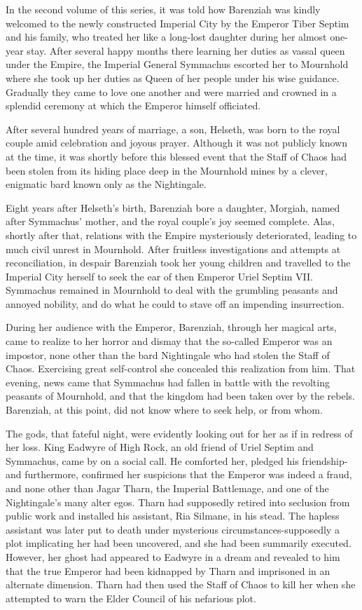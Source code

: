 \clearpage
{}

\dropcap In the second volume of this series, it was told how Barenziah was kindly welcomed to the newly constructed Imperial City by the Emperor Tiber Septim and his family, who treated her like a long-lost daughter during her almost one-year stay. After several happy months there learning her duties as vassal queen under the Empire, the Imperial General Symmachus escorted her to Mournhold where she took up her duties as Queen of her people under his wise guidance. Gradually they came to love one another and were married and crowned in a splendid ceremony at which the Emperor himself officiated.

After several hundred years of marriage, a son, Helseth, was born to the royal couple amid celebration and joyous prayer. Although it was not publicly known at the time, it was shortly before this blessed event that the Staff of Chaos had been stolen from its hiding place deep in the Mournhold mines by a clever, enigmatic bard known only as the Nightingale.

Eight years after Helseth's birth, Barenziah bore a daughter, Morgiah, named after Symmachus' mother, and the royal couple's joy seemed complete. Alas, shortly after that, relations with the Empire mysteriously deteriorated, leading to much civil unrest in Mournhold. After fruitless investigations and attempts at reconciliation, in despair Barenziah took her young children and travelled to the Imperial City herself to seek the ear of then Emperor Uriel Septim VII. Symmachus remained in Mournhold to deal with the grumbling peasants and annoyed nobility, and do what he could to stave off an impending insurrection.

During her audience with the Emperor, Barenziah, through her magical arts, came to realize to her horror and dismay that the so-called Emperor was an impostor, none other than the bard Nightingale who had stolen the Staff of Chaos. Exercising great self-control she concealed this realization from him. That evening, news came that Symmachus had fallen in battle with the revolting peasants of Mournhold, and that the kingdom had been taken over by the rebels. Barenziah, at this point, did not know where to seek help, or from whom.

The gods, that fateful night, were evidently looking out for her as if in redress of her loss. King Eadwyre of High Rock, an old friend of Uriel Septim and Symmachus, came by on a social call. He comforted her, pledged his friendship-and furthermore, confirmed her suspicions that the Emperor was indeed a fraud, and none other than Jagar Tharn, the Imperial Battlemage, and one of the Nightingale's many alter egos. Tharn had supposedly retired into seclusion from public work and installed his assistant, Ria Silmane, in his stead. The hapless assistant was later put to death under mysterious circumstances-supposedly a plot implicating her had been uncovered, and she had been summarily executed. However, her ghost had appeared to Eadwyre in a dream and revealed to him that the true Emperor had been kidnapped by Tharn and imprisoned in an alternate dimension. Tharn had then used the Staff of Chaos to kill her when she attempted to warn the Elder Council of his nefarious plot.

